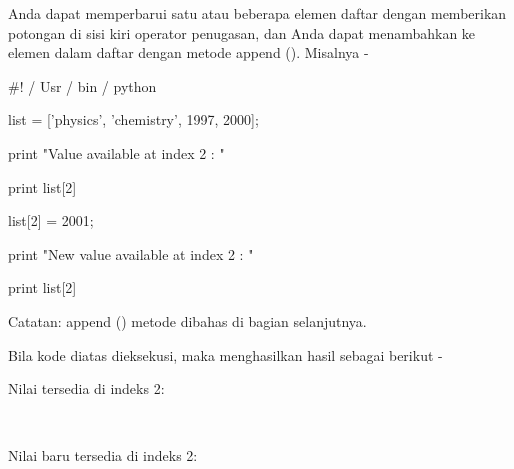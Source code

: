\documentclass[a4paper,12pt]{report}
\begin{document}
\vspace{14pt}
\noindent 
{\fontsize{14pt}{14pt}\selectfont Anda dapat memperbarui satu atau beberapa elemen daftar dengan memberikan potongan di sisi kiri operator penugasan, dan Anda dapat menambahkan ke elemen dalam daftar dengan metode append (). Misalnya - \\} \par
\vspace{14pt}
\noindent 
{\fontsize{14pt}{14pt}\selectfont  $  \#  $! / Usr / bin / python \\} \par
\noindent 
\vspace{14pt}
\noindent 
{\fontsize{14pt}{14pt}\selectfont list = ['physics', 'chemistry', 1997, 2000]; \\} \par
\noindent 
\vspace{14pt}
\noindent 
{\fontsize{14pt}{14pt}\selectfont print "Value available at index 2 : " \\} \par
\noindent 
{\fontsize{14pt}{14pt}\selectfont print list[2] \\} \par
\noindent 
{\fontsize{14pt}{14pt}\selectfont list[2] = 2001; \\} \par
\noindent 
{\fontsize{14pt}{14pt}\selectfont print "New value available at index 2 : " \\} \par
\noindent 
{\fontsize{14pt}{14pt}\selectfont print list[2] \\} \par
\noindent 
{\fontsize{14pt}{14pt}\selectfont Catatan: append () metode dibahas di bagian selanjutnya. \\} \par
\vspace{14pt}
\noindent 
{\fontsize{14pt}{14pt}\selectfont Bila kode diatas dieksekusi, maka menghasilkan hasil sebagai berikut - \\} \par
\noindent 
{\fontsize{14pt}{14pt}\selectfont Nilai tersedia di indeks 2: \\} \par
\vspace{14pt}
\noindent 
{\fontsize{14pt}{14pt} \\} \par
\vspace{14pt}
\noindent 
{\fontsize{14pt}{14pt}\selectfont Nilai baru tersedia di indeks 2: \\} \par
\end{document}
